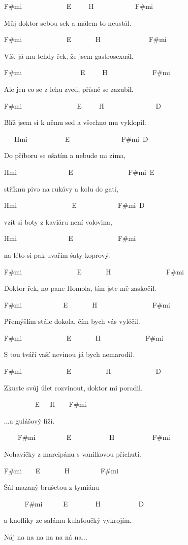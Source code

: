 
F\#mi~~~~~~~~~~~~~E~~~~~H~~~~~~~~~~~~F\#mi

Můj doktor sebou sek a málem to neustál.

F\#mi~~~~~~~~~~~~~E~~~~~~~H~~~~~~~~~~~~~~F\#mi

Víš, já mu tehdy řek, že jsem gastrosexuál.


F\#mi~~~~~~~~~~~~~~~~~E~~~~~H~~~~~~~~~~~~~F\#mi

Ale jen co se z lehu zved, přísně se zazubil.

F\#mi~~~~~~~~~~~~~~~~E~~~~~H~~~~~~~~~~~~~~~D

Blíž jsem si k němu sed a všechno mu vyklopil.

\bigskip

\begin{chorustext}
~~~Hmi~~~~~~~~~~~E~~~~~~~~~~~~~~~F\#mi~D

Do příboru se ošatím a nebude mi zima,

Hmi~~~~~~~~~~~~~~~E~~~~~~~~~~~~~~~~F\#mi~E

stříknu pivo na rukávy a kolu do gatí,

Hmi~~~~~~~~~~~~~~~~E~~~~~~~~~~~~F\#mi~D

vzít si boty z kaviáru není volovina,

Hmi~~~~~~~~~~~~~~~E~~~~~~~~~~~~~F\#mi

na léto si pak uvařím šaty koprový.
\end{chorustext}

\bigskip

F\#mi~~~~~~~~~~~~~~~~E~~~~~~~H~~~~~~~~~~~~~~~~F\#mi

Doktor řek, no pane Homola, tím jste mě zaskočil.

F\#mi~~~~~~~~~~~~E~~~~~~~H~~~~~~~~~~~~~~~~F\#mi

Přemýšlím stále dokola, čím bych vás vyléčil.

F\#mi~~~~~~~~~~~~~E~~~~~~~H~~~~~~~~~~~~~F\#mi

S tou tváří vaší nevinou já bych nemarodil.

F\#mi~~~~~~~~~~~~~E~~~~~~~~~~H~~~~~~~~~~~~~D

Zkuste svůj úlet rozvinout, doktor mi poradil.

\bigskip

~~~~~~~~~E~~~H~~~~F\#mi

\chorus...a gulášový fiží.

~~~~F\#mi~~~~~~~~~E~~~~~~~~~~~H~~~~~~~~~~~F\#mi

Nohavičky z marcipánu s vanilkovou příchutí.

F\#mi~~~~E~~~~~~~H~~~~~~~~~F\#mi

Šál mazaný brušetou z tymiánu

~~~~~~F\#mi~~~~~~E~~~~~~~~H~~~~~~~~~~~D

a knoflíky ze salámu kulaťoučký vykrojím.

\bigskip

\begin{chorustext}
Náj na na na na na ná na...
\end{chorustext}

\bigskip

\chorus